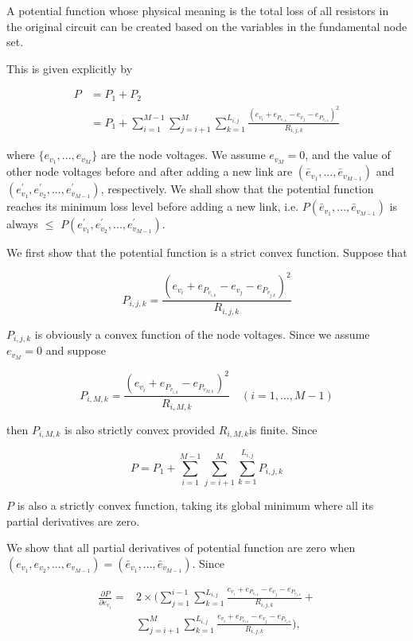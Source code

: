 A potential function whose physical meaning is the total loss of all resistors in the original circuit can be created based on the variables in the fundamental node set.

This is given explicitly by

$$\begin{split} P & =  P_1+P_2\\ &=P_1+\sum_{i=1}^{M-1}\sum_{j=i+1}^{M}\sum_{k=1}^{L_{i,j}}\frac{(e_{v_i}+e_{P_{v_{i,k}}}-e_{v_j}-e_{P_{v_{j,k}}})^2}{R_{i,j,k}} \end{split} \label{eq:jb:loss}$$

where $\{e_{v_1},...,e_{v_{M}}\}$ are the node voltages. We assume $e_{v_M}=0$, and the value of other node voltages before and after adding a new link are $(\bar{e}_{v_1},...,\bar{e}_{v_{M-1}})$ and $(e_{v_1}^{'},e_{v_2}^{'},...,e_{v_{M-1}}^{'})$, respectively. We shall show that the potential function reaches its minimum loss level before adding a new link, i.e. $P(\bar{e}_{v_1},...,\bar{e}_{v_{M-1}})$ is always $\leq$ $P(e_{v_1}^{'},e_{v_2}^{'},...,e_{v_{M-1}}^{'})$.

We first show that the potential function is a strict convex function. Suppose that

$$P_{i,j,k}=\frac{(e_{v_i}+e_{P_{v_{i,k}}}-e_{v_j}-e_{P_{v_{j,k}}})^2}{R_{i,j,k}}$$

$P_{i,j,k}$ is obviously a convex function of the node voltages. Since we assume $e_{v_M}=0$ and suppose

$$P_{i,M,k}=\frac{(e_{v_i}+e_{P_{v_{i,k}}}-e_{P_{v_{M,k}}})^2}{R_{i,M,k}}  \quad (i=1,...,M-1)$$

then $P_{i,M,k}$ is also strictly convex provided $R_{i,M,k}$is finite. Since

$$P=  P_1 + \sum_{i=1}^{M-1}\sum_{j=i+1}^{M}\sum_{k=1}^{L_{i,j}}P_{i,j,k}$$

$P$ is also a strictly convex function, taking its global minimum where all its partial derivatives are zero.

We show that all partial derivatives of potential function are zero when $(e_{v_1},e_{v_2},...,e_{v_{M-1}}) = (\bar{e}_{v_1},...,\bar{e}_{v_{M-1}})$. Since

$$\begin{split} \frac{\partial P}{\partial e_{v_i}}=  & 2\times(\sum_{j=1}^{i-1}\sum_{k=1}^{L_{i,j}}\frac{e_{v_i}+e_{P_{v_{i,k}}}-e_{v_j}-e_{P_{v_{j,k}}}}{R_{i,j,k}}+ \\ & \sum_{j=i+1}^{M}\sum_{k=1}^{L_{i,j}}\frac{e_{v_i}+e_{P_{v_{i,k}}}-e_{v_j}-e_{P_{v_{j,k}}}}{R_{i,j,k}}), 
\end{split}\label{kir}$$

